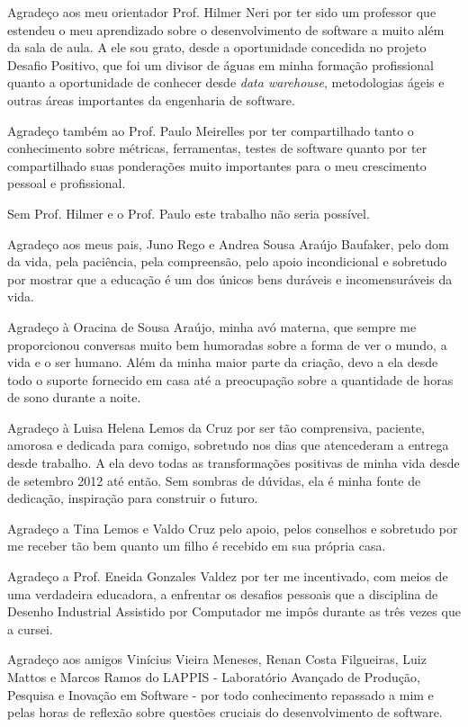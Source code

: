 \begin{agradecimentos}
Agradeço aos meu orientador Prof. Hilmer Neri por ter sido um professor que estendeu o meu aprendizado sobre o desenvolvimento de software a muito além da sala de aula. A ele sou grato, desde a oportunidade concedida no projeto Desafio Positivo, que foi um divisor de águas em minha formação profissional quanto a oportunidade de conhecer desde \textit{data warehouse},  metodologias ágeis e outras áreas importantes da engenharia de software.

Agradeço também ao Prof. Paulo Meirelles por ter compartilhado tanto o conhecimento sobre métricas, ferramentas, testes de software quanto por ter compartilhado suas ponderações muito importantes para o meu crescimento pessoal e profissional. 

Sem Prof. Hilmer e o Prof. Paulo este trabalho não seria possível.

Agradeço aos meus pais, Juno Rego e Andrea Sousa Araújo Baufaker, pelo dom da vida, pela paciência, pela compreensão, pelo apoio incondicional e sobretudo por mostrar que a educação é um dos únicos bens duráveis e incomensuráveis da vida. 

Agradeço à Oracina de Sousa Araújo, minha avó materna, que sempre me proporcionou conversas muito bem humoradas sobre a forma de ver o mundo, a vida e o ser humano. Além da minha maior parte da criação, devo a ela desde todo o suporte fornecido em casa até a preocupação sobre a quantidade de horas de sono durante a noite.

Agradeço à Luisa Helena Lemos da Cruz por ser tão comprensiva, paciente, amorosa e dedicada para comigo, sobretudo nos dias que atencederam a entrega desde trabalho. A ela devo todas as transformações positivas de minha vida desde de setembro 2012 até então. Sem sombras de dúvidas, ela é minha fonte de dedicação, inspiração para construir o futuro. 

Agradeço a Tina Lemos e Valdo Cruz pelo apoio, pelos conselhos e sobretudo por me receber tão bem quanto um filho é recebido em sua própria casa.

Agradeço a Prof. Eneida Gonzales Valdez por ter me incentivado, com meios de uma verdadeira educadora, a enfrentar os desafios pessoais que a disciplina de Desenho Industrial Assistido por Computador me impôs durante as três vezes que a cursei.

Agradeço aos amigos Vinícius Vieira Meneses, Renan Costa Filgueiras, Luiz Mattos e Marcos Ramos do LAPPIS - Laboratório Avançado de Produção, Pesquisa e Inovação em Software - por todo conhecimento repassado a mim e pelas horas de reflexão sobre questões cruciais do desenvolvimento de software.  

\end{agradecimentos}
